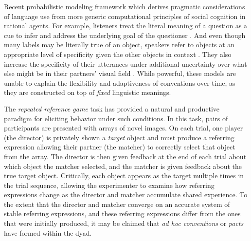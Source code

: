 \documentclass[11pt]{article}
\begin{document}
Recent probabilistic modeling framework which derives pragmatic considerations of language use from more generic computational principles of social cognition in rational agents.
For example, listeners treat the literal meaning of a question as a cue to infer and address the underlying goal of the questioner \cite{hawkins_why_2015, hawkins_QA_2018}.
And even though many labels may be literally true of an object, speakers refer to objects at an appropriate level of specificity given the other objects in context \cite{graf_animal_2016, monroe2017colors}.
They also increase the specificity of their utterances under additional uncertainty over what else might be in their partners' visual field \cite{hawkins_conversational_2016, hawkins2018speakers}.
While powerful, these models are unable to explain the flexibility and adaptiveness of conventions over time, as they are constructed on top of \emph{fixed} linguistic meanings.

The \emph{repeated reference game} task has provided a natural and productive paradigm for eliciting behavior under such conditions.
In this task, pairs of participants are presented with arrays of novel images.
On each trial, one player (the director) is privately shown a \emph{target} object and must produce a referring expression allowing their partner (the matcher) to correctly select that object from the array.
The director is then given feedback at the end of each trial about which object the matcher selected, and the matcher is given feedback about the true target object.
Critically, each object appears as the target multiple times in the trial sequence, allowing the experimenter to examine how referring expressions change as the director and matcher accumulate shared experience.
To the extent that the director and matcher converge on an accurate system of stable referring expressions, and these referring expressions differ from the ones that were initially produced, it may be claimed that \emph{ad hoc conventions} or \emph{pacts} have formed within the dyad.
\end{document}
